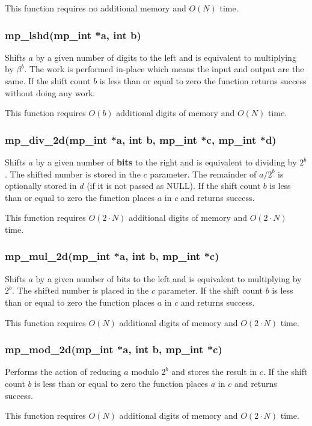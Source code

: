 \documentclass{article}
\begin{document}
This function requires no additional memory and $O(N)$ time.

\subsubsection{mp\_lshd(mp\_int *a, int b)}
Shifts $a$ by a given number of digits to the left and is equivalent to multiplying by $\beta^b$.  The work
is performed in-place which means the input and output are the same.  If the shift count $b$ is less than or equal 
to zero the function returns success without doing any work.

This function requires $O(b)$ additional digits of memory and $O(N)$ time.

\subsubsection{mp\_div\_2d(mp\_int *a, int b, mp\_int *c, mp\_int *d)}
Shifts $a$ by a given number of \textbf{bits} to the right and is equivalent to dividing by $2^b$.  The shifted number is stored
in the $c$ parameter.  The remainder of $a/2^b$ is optionally stored in $d$ (if it is not passed as NULL).  
If the shift count $b$ is less than or equal to zero the function places $a$ in $c$ and returns success.  

This function requires $O(2 \cdot N)$ additional digits of memory and $O(2 \cdot N)$ time.

\subsubsection{mp\_mul\_2d(mp\_int *a, int b, mp\_int *c)}
Shifts $a$ by a given number of bits to the left and is equivalent to multiplying by $2^b$.  The shifted number
is placed in the $c$ parameter.  If the shift count $b$ is less than or equal to zero the function places $a$
in $c$ and returns success.  

This function requires $O(N)$ additional digits of memory and $O(2 \cdot N)$ time.

\subsubsection{mp\_mod\_2d(mp\_int *a, int b, mp\_int *c)}
Performs the action of reducing $a$ modulo $2^b$ and stores the result in $c$.  If the shift count $b$ is less than 
or equal to zero the function places $a$ in $c$ and returns success.  

This function requires $O(N)$ additional digits of memory and $O(2 \cdot N)$ time.
\end{document}

